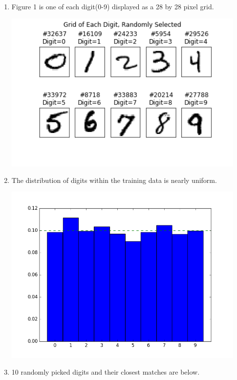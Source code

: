 \documentclass{report}
\begin{document}
\begin{enumerate}
\begin{enumerate}[label=(\alph*)]
		\item Figure 1 is one of each digit(0-9) displayed as a 28 by 28 pixel grid.  
		\begin{center}
		\includegraphics[width=12cm]{images/one_grid_x_each_digit.png}
		\end{center}
		\item The distribution of digits within the training data is nearly uniform.
		\begin{center}
		\includegraphics[width=12cm]{images/distrib.png}
		\end{center}
		
		\item 10 randomly picked digits and their closest matches are below.
		

\end{enumerate}
\end{enumerate}
\end{document}
